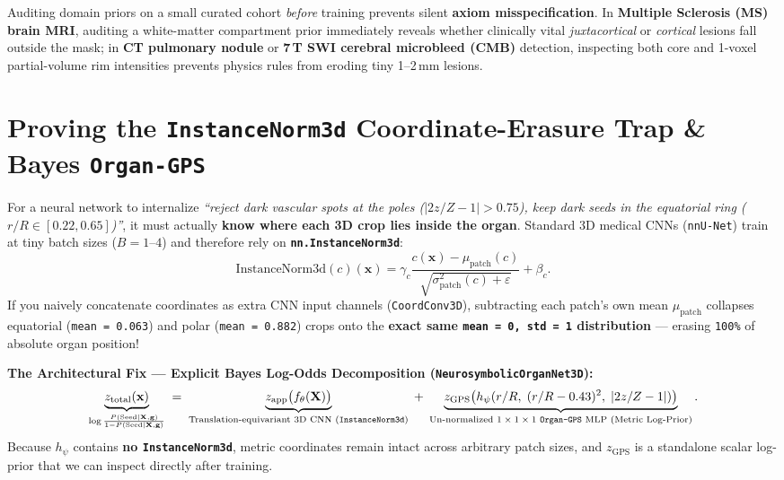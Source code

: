 \documentclass[10pt,a4paper]{article}
\begin{document}
\begin{clinbox}
Auditing domain priors on a small curated cohort \textit{before} training prevents silent \textbf{axiom misspecification}. In \textbf{Multiple Sclerosis (MS) brain MRI}, auditing a white-matter compartment prior immediately reveals whether clinically vital \textit{juxtacortical} or \textit{cortical} lesions fall outside the mask; in \textbf{CT pulmonary nodule} or \textbf{7\,T SWI cerebral microbleed (CMB)} detection, inspecting both core and 1-voxel partial-volume rim intensities prevents physics rules from eroding tiny 1--2\,mm lesions.
\end{clinbox}

\section{Proving the \texttt{InstanceNorm3d} Coordinate-Erasure Trap \& Bayes \texttt{Organ-GPS}}

For a neural network to internalize \textit{``reject dark vascular spots at the poles ($|2z/Z - 1| > 0.75$), keep dark seeds in the equatorial ring ($r/R \in [0.22, 0.65]$)''}, it must actually \textbf{know where each 3D crop lies inside the organ}. Standard 3D medical CNNs (\texttt{nnU-Net}) train at tiny batch sizes ($B = 1$--$4$) and therefore rely on \textbf{\texttt{nn.InstanceNorm3d}}:
\[
    \text{InstanceNorm3d}(c)(\mathbf{x}) = \gamma_c \frac{c(\mathbf{x}) - \mu_{\text{patch}}(c)}{\sqrt{\sigma_{\text{patch}}^2(c) + \varepsilon}} + \beta_c.
\]
If you naively concatenate coordinates as extra CNN input channels (\texttt{CoordConv3D}), subtracting each patch's own mean $\mu_{\text{patch}}$ collapses equatorial (\texttt{mean = 0.063}) and polar (\texttt{mean = 0.882}) crops onto the \textbf{exact same \texttt{mean = 0, std = 1} distribution} --- erasing \texttt{100\%} of absolute organ position!

\textbf{The Architectural Fix --- Explicit Bayes Log-Odds Decomposition (\texttt{NeurosymbolicOrganNet3D}):}
\[
    \underbrace{z_{\text{total}}(\mathbf{x})}_{\log \frac{P(\text{Seed} \mid \mathbf{X}, \mathbf{g})}{1 - P(\text{Seed} \mid \mathbf{X}, \mathbf{g})}}
    \;=\;
    \underbrace{z_{\text{app}}\big(f_\theta(\mathbf{X})\big)}_{\text{Translation-equivariant 3D CNN (\texttt{InstanceNorm3d})}}
    \;+\;
    \underbrace{z_{\text{GPS}}\big(h_\psi(r/R,\; (r/R - 0.43)^2,\; |2z/Z - 1|)\big)}_{\text{Un-normalized $1\times 1\times 1$ \texttt{Organ-GPS} MLP (Metric Log-Prior)}}.
\]
Because $h_\psi$ contains \textbf{no \texttt{InstanceNorm3d}}, metric coordinates remain intact across arbitrary patch sizes, and $z_{\text{GPS}}$ is a standalone scalar log-prior that we can inspect directly after training.
\end{document}
